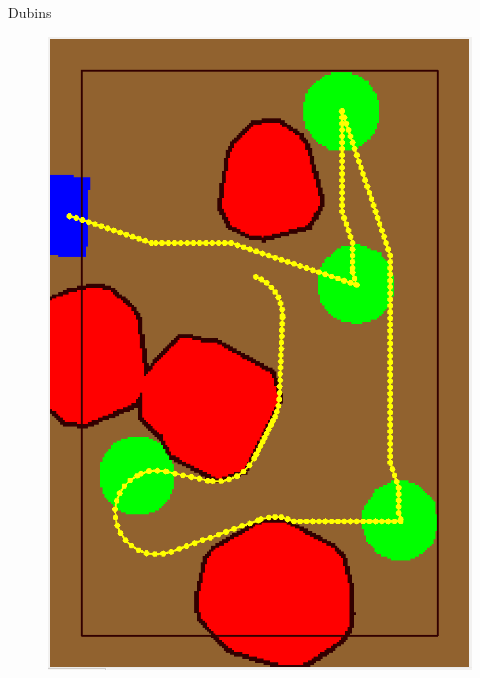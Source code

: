 \begin{frame}[fragile]{Dubins}
\begin{figure}[H]
\begin{minipage}{0.45\linewidth}
		\includegraphics[scale=0.15]{Immagini/map1}
	\end{minipage}
\end{figure}
\end{frame}

